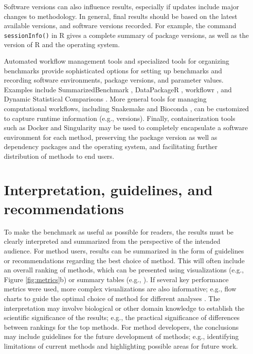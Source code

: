 \documentclass[12pt, a4paper]{article}
\begin{document}
Software versions can also influence results, especially if updates include major changes to methodology. In general, final results should be based on the latest available versions, and software versions recorded. For example, the command \texttt{sessionInfo()} in R gives a complete summary of package versions, as well as the version of R and the operating system.

Automated workflow management tools and specialized tools for organizing benchmarks provide sophisticated options for setting up benchmarks and recording software environments, package versions, and parameter values. Examples include SummarizedBenchmark \citep{Kimes2018}, DataPackageR \citep{Finak2018}, workflowr \citep{Blischak2018}, and Dynamic Statistical Comparisons \citep{Wang2018}. More general tools for managing computational workflows, including Snakemake \citep{Koster2012} and Bioconda \citep{Gruning2018}, can be customized to capture runtime information (e.g., versions). Finally, containerization tools such as Docker and Singularity may be used to completely encapsulate a software environment for each method, preserving the package version as well as dependency packages and the operating system, and facilitating further distribution of methods to end users.




\section*{Interpretation, guidelines, and recommendations}

To make the benchmark as useful as possible for readers, the results must be clearly interpreted and summarized from the perspective of the intended audience. For method users, results can be summarized in the form of guidelines or recommendations regarding the best choice of method. This will often include an overall ranking of methods, which can be presented using visualizations (e.g., Figure \ref{fig:metrics}b) or summary tables (e.g., \citep{Aghaeepour2013, Weber2016}). If several key performance metrics were used, more complex visualizations are also informative; e.g., flow charts to guide the optimal choice of method for different analyses \citep{Saelens2018b}. The interpretation may involve biological or other domain knowledge to establish the scientific significance of the results; e.g., the practical significance of differences between rankings for the top methods. For method developers, the conclusions may include guidelines for the future development of methods; e.g., identifying limitations of current methods and highlighting possible areas for future work.
\end{document}
